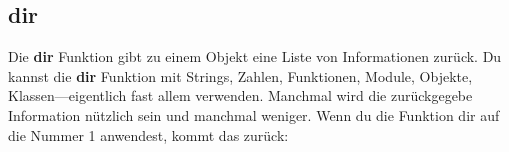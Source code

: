 




\subsection*{dir}

Die \textbf{dir} Funktion gibt zu einem Objekt eine Liste von Informationen zurück. Du kannst die \textbf{dir} Funktion mit Strings, Zahlen, Funktionen, Module, Objekte, Klassen---eigentlich fast allem verwenden. Manchmal wird die zurückgegebe Information nützlich sein und manchmal weniger. Wenn du die Funktion dir auf die Nummer 1 anwendest, kommt das zurück:

